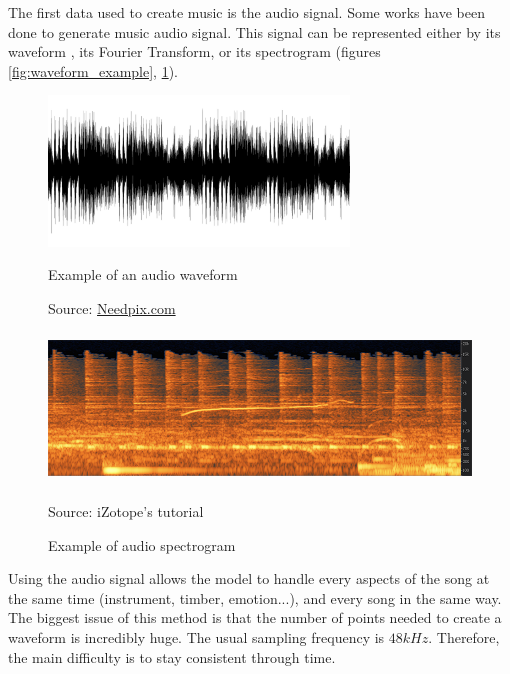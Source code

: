 \documentclass[12pt]{report}
\begin{document}
The first data used to create music is the audio signal. Some works \cite{oord_wavenet:_2016, dieleman_challenge_2018, donahue_adversarial_2019, kalchbrenner_efficient_2018, mehri_samplernn_2017, lu_play_2018} have been done to generate music audio signal.
This signal can be represented either by its waveform \cite{oord_wavenet:_2016}, its Fourier Transform, or its spectrogram (figures \ref{fig:waveform_example}, \ref{fig:spectrogram_example}).

\begin{figure}[H]
   \begin{minipage}{0.5\textwidth}
     \centering
     \includegraphics[width=.9\linewidth, height=4cm]{images/music/waveform/waveform.png}
     \caption{Example of an audio waveform}
     Source: \href{https://www.needpix.com/photo/856116/audio-aural-ear-hearing-music-musical-recording-silhouette-sonic}{Needpix.com}
     \label{fig:waveform_example}
   \end{minipage}\hfill
   \begin{minipage}{0.5\textwidth}
     \centering
     \includegraphics[width=\linewidth, height=4cm]{images/music/spectrogram/izotope-spectrogram.png}
     \caption{Example of audio spectrogram}
     Source: iZotope's tutorial \cite{noauthor_understanding_nodate} %
     \label{fig:spectrogram_example}
   \end{minipage}
\end{figure}

Using the audio signal allows the model to handle every aspects of the song at the same time (instrument, timber, emotion...), and every song in the same way.
The biggest issue of this method is that the number of points needed to create a waveform is incredibly huge.
The usual sampling frequency is $48kHz$. 
Therefore, the main difficulty is to stay consistent through time.
\end{document}
